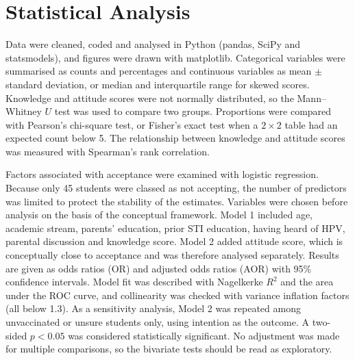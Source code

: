 \section{Statistical Analysis}
Data were cleaned, coded and analysed in Python (pandas, SciPy and statsmodels), and figures were drawn with matplotlib. Categorical variables were summarised as counts and percentages and continuous variables as mean $\pm$ standard deviation, or median and interquartile range for skewed scores. Knowledge and attitude scores were not normally distributed, so the Mann--Whitney $U$ test was used to compare two groups. Proportions were compared with Pearson's chi-square test, or Fisher's exact test when a $2\times2$ table had an expected count below 5. The relationship between knowledge and attitude scores was measured with Spearman's rank correlation.

Factors associated with acceptance were examined with logistic regression. Because only 45 students were classed as not accepting, the number of predictors was limited to protect the stability of the estimates. Variables were chosen before analysis on the basis of the conceptual framework. Model 1 included age, academic stream, parents' education, prior STI education, having heard of HPV, parental discussion and knowledge score. Model 2 added attitude score, which is conceptually close to acceptance and was therefore analysed separately. Results are given as odds ratios (OR) and adjusted odds ratios (AOR) with 95\% confidence intervals. Model fit was described with Nagelkerke $R^2$ and the area under the ROC curve, and collinearity was checked with variance inflation factors (all below 1.3). As a sensitivity analysis, Model 2 was repeated among unvaccinated or unsure students only, using intention as the outcome. A two-sided $p<0.05$ was considered statistically significant. No adjustment was made for multiple comparisons, so the bivariate tests should be read as exploratory.
